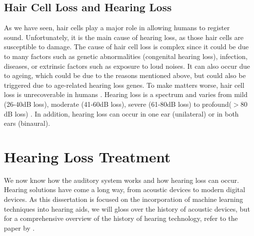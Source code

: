 \documentclass[logo,bsc,singlespacing,parskip,online]{infthesis}
\begin{document}
\subsection{Hair Cell Loss and Hearing Loss}
As we have seen, hair cells play a major role in allowing humans to register sound. Unfortunately,
it is the main cause of hearing loss, as those hair cells are susceptible to damage.
The cause of hair cell loss is complex since it could be due to many factors such as 
genetic abnormalities (congenital hearing loss), infection, diseases, or extrinsic factors such as exposure to loud noises.
It can also occur due to ageing, which could be due to the reasons mentioned above, but could also be triggered due to age-related hearing loss genes. To make matters worse, hair cell loss is unrecoverable in humans \citep{Furness2015HairCell}.
Hearing loss is a spectrum and varies from mild (26-40dB loss), moderate (41-60dB loss), severe (61-80dB loss) to profound($>80$dB loss) \citep{Nieman2020HearingLoss}.
In addition, hearing loss can occur in one ear (unilateral) or in both ears (binaural). 

\section{Hearing Loss Treatment}

We now know how the auditory system works and how hearing loss can occur.
Hearing solutions have come a long way, 
from acoustic devices to modern digital devices. 
As this dissertation is focused on 
the incorporation of machine learning techniques into hearing aids,
we will gloss over the history of acoustic devices, but 
for a comprehensive overview of the history of hearing technology,
refer to the paper by \citet{levitt_historical_2007}.


\end{document}
